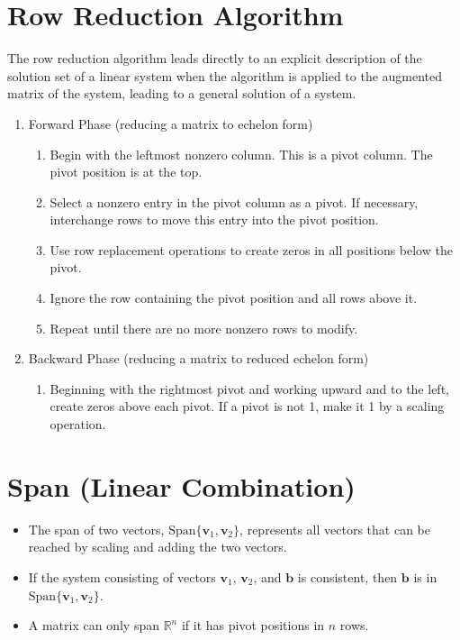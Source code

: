 \documentclass{article}
\begin{document}
\section*{Row Reduction Algorithm}
The row reduction algorithm leads directly to an explicit description of the solution set of a
linear system when the algorithm is applied to the augmented matrix of the system, leading to a
general solution of a system.
\begin{enumerate}
    \item Forward Phase (reducing a matrix to echelon form)
    \begin{enumerate}
        \item Begin with the leftmost nonzero column. This is a pivot column. The pivot position is
        at the top.
        \item Select a nonzero entry in the pivot column as a pivot. If necessary, interchange rows
        to move this entry into the pivot position.
        \item Use row replacement operations to create zeros in all positions below the pivot.
        \item Ignore the row containing the pivot position and all rows above it.
        \item Repeat until there are no more nonzero rows to modify.
    \end{enumerate}
    \item Backward Phase (reducing a matrix to reduced echelon form)
    \begin{enumerate}
        \item Beginning with the rightmost pivot and working upward and to the left, create zeros
        above each pivot. If a pivot is not 1, make it 1 by a scaling operation.
    \end{enumerate}
\end{enumerate}

\section*{Span (Linear Combination)}
\begin{itemize}
    \item The span of two vectors, $\text{Span}\{\mathbf{v}_1, \mathbf{v}_2\}$, represents all
    vectors that can be reached by scaling and adding the two vectors.
    \item If the system consisting of vectors $\mathbf{v}_1$, $\mathbf{v}_2$, and $\mathbf{b}$ is
    consistent, then $\mathbf{b}$ is in $\text{Span}\{\mathbf{v}_1, \mathbf{v}_2\}$.
    \item A matrix can only span $\mathbb{R}^n$ if it has pivot positions in $n$ rows.
\end{itemize}
\end{document}
